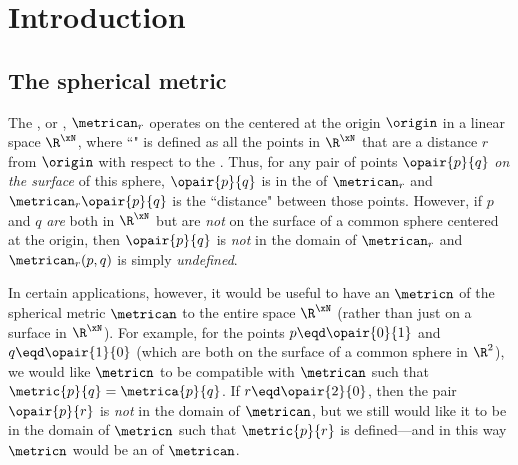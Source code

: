 \section{Introduction}
\subsection{The spherical metric}
The , or ,
$\metrican_r$ operates on the 
centered at the origin $\origin$ in a linear space $\R^\xN$,
where ``" is defined as all the points 
in $\R^\xN$ that are a distance $r$ from $\origin$ with respect to the 
 .
Thus, for any pair of points $\opair{p}{q}$ \emph{on the surface} of this sphere,
$\opair{p}{q}$ is in the  of $\metrican_r$ and 
$\metrican_r\opair{p}{q}$ is the ``distance" between those points.
However, if $p$ and $q$ \emph{are} both in $\R^\xN$ but are \emph{not} on the surface of a    %
common sphere centered at the origin, then $\opair{p}{q}$ is \emph{not} in the domain
of $\metrican_r$ and $\metrican_r(p,q)$ is simply \emph{undefined}.                             %

In certain applications, however, it would be useful to have an  $\metricn$
of the spherical metric $\metrican$ to the entire space $\R^\xN$ (rather than just on a surface in $\R^\xN$).  %
For example, for the points $p\eqd\opair{0}{1}$ and $q\eqd\opair{1}{0}$
(which are both on the surface of a common sphere in $\R^2$),
we would like $\metricn$ to be compatible with $\metrican$ such that $\metric{p}{q}=\metrica{p}{q}$.
If $r\eqd\opair{2}{0}$, then the pair $\opair{p}{r}$ is \emph{not} in the domain of $\metrican$,
but we still would like it to be in the domain of $\metricn$ such that $\metric{p}{r}$ is defined---and 
in this way $\metricn$ would be an  of $\metrican$.                                                                        %

